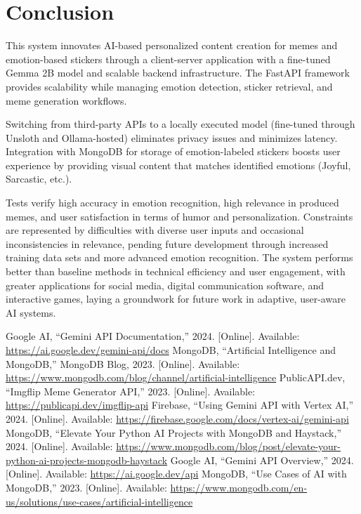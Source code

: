 \documentclass[conference]{IEEEtran}
\begin{document}
%

\section{Conclusion}
This system innovates AI-based personalized content creation for memes and emotion-based stickers through a client-server application with a fine-tuned Gemma 2B model and scalable backend infrastructure. The FastAPI framework provides scalability while managing emotion detection, sticker retrieval, and meme generation workflows.

Switching from third-party APIs to a locally executed model (fine-tuned through Unsloth and Ollama-hosted) eliminates privacy issues and minimizes latency. Integration with MongoDB for storage of emotion-labeled stickers boosts user experience by providing visual content that matches identified emotions (Joyful, Sarcastic, etc.).

Tests verify high accuracy in emotion recognition, high relevance in produced memes, and user satisfaction in terms of humor and personalization. Constraints are represented by difficulties with diverse user inputs and occasional inconsistencies in relevance, pending future development through increased training data sets and more advanced emotion recognition. The system performs better than baseline methods in technical efficiency and user engagement, with greater applications for social media, digital communication software, and interactive games, laying a groundwork for future work in adaptive, user-aware AI systems.

%

\begin{thebibliography}{00}
 Google AI, “Gemini API Documentation,” 2024. [Online]. Available: \url{https://ai.google.dev/gemini-api/docs}
 MongoDB, “Artificial Intelligence and MongoDB,” MongoDB Blog, 2023. [Online]. Available: \url{https://www.mongodb.com/blog/channel/artificial-intelligence}
 PublicAPI.dev, “Imgflip Meme Generator API,” 2023. [Online]. Available: \url{https://publicapi.dev/imgflip-api}
 Firebase, “Using Gemini API with Vertex AI,” 2024. [Online]. Available: \url{https://firebase.google.com/docs/vertex-ai/gemini-api}
 MongoDB, “Elevate Your Python AI Projects with MongoDB and Haystack,” 2024. [Online]. Available: \url{https://www.mongodb.com/blog/post/elevate-your-python-ai-projects-mongodb-haystack}
 Google AI, “Gemini API Overview,” 2024. [Online]. Available: \url{https://ai.google.dev/api}
 MongoDB, “Use Cases of AI with MongoDB,” 2023. [Online]. Available: \url{https://www.mongodb.com/en-us/solutions/use-cases/artificial-intelligence}
\end{thebibliography}
\end{document}
